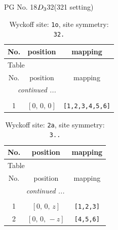 \documentclass[fleqn,8pt]{jsarticle}
\begin{document}
\setcounter{MaxMatrixCols}{32}

\renewcommand{\tablename}{Table~}
\renewcommand{\figurename}{Figure~}
\begin{center}
\LARGE
PG No. 18\quad$D_{\rm 3}$\quad$32$\quad(321 setting)\quad[ trigonal ]
\end{center}
\renewcommand{\arraystretch}{1.2}
\begin{longtable}{ccc}
\caption{Wyckoff site: {\tt 1o}, site symmetry: {\tt 32.}}
 \\
 \hline \hline
No. & position & mapping \\ \hline \endfirsthead

\multicolumn{2}{l}{\tablename\ \thetable{}} \\
 \hline \hline
No. & position & mapping \\ \hline \endhead

 \hline \hline
\multicolumn{2}{r}{\footnotesize\it continued ...} \\ \endfoot

 \hline \hline
\multicolumn{2}{r}{} \\ \endlastfoot

1 & $\left[ 0,\, 0,\, 0 \right]$ & {\tt [1,2,3,4,5,6]} \\
\end{longtable}
\renewcommand{\arraystretch}{1.2}
\begin{longtable}{ccc}
\caption{Wyckoff site: {\tt 2a}, site symmetry: {\tt 3..}}
 \\
 \hline \hline
No. & position & mapping \\ \hline \endfirsthead

\multicolumn{2}{l}{\tablename\ \thetable{}} \\
 \hline \hline
No. & position & mapping \\ \hline \endhead

 \hline \hline
\multicolumn{2}{r}{\footnotesize\it continued ...} \\ \endfoot

 \hline \hline
\multicolumn{2}{r}{} \\ \endlastfoot

1 & $\left[ 0,\, 0,\, z \right]$ & {\tt [1,2,3]} \\ \hline
2 & $\left[ 0,\, 0,\, - z \right]$ & {\tt [4,5,6]} \\
\end{longtable}
\renewcommand{\arraystretch}{1.2}
\end{document}
